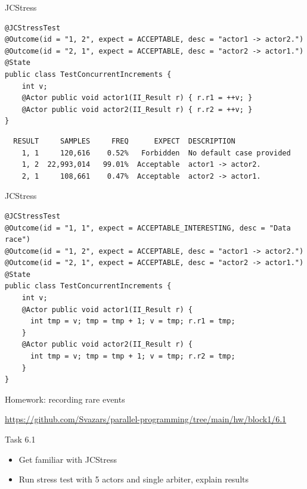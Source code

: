\begin{frame}{JCStress}
\begin{verbatim}
@JCStressTest
@Outcome(id = "1, 2", expect = ACCEPTABLE, desc = "actor1 -> actor2.")
@Outcome(id = "2, 1", expect = ACCEPTABLE, desc = "actor2 -> actor1.")
@State
public class TestConcurrentIncrements {
    int v;
    @Actor public void actor1(II_Result r) { r.r1 = ++v; }
    @Actor public void actor2(II_Result r) { r.r2 = ++v; }
}
\end{verbatim}

\begin{verbatim}
  RESULT     SAMPLES     FREQ      EXPECT  DESCRIPTION
    1, 1     120,616    0.52%   Forbidden  No default case provided
    1, 2  22,993,014   99.01%  Acceptable  actor1 -> actor2.
    2, 1     108,661    0.47%  Acceptable  actor2 -> actor1.
\end{verbatim}
\end{frame}

\begin{frame}{JCStress}

\begin{verbatim}
@JCStressTest
@Outcome(id = "1, 1", expect = ACCEPTABLE_INTERESTING, desc = "Data race")
@Outcome(id = "1, 2", expect = ACCEPTABLE, desc = "actor1 -> actor2.")
@Outcome(id = "2, 1", expect = ACCEPTABLE, desc = "actor2 -> actor1.")
@State
public class TestConcurrentIncrements {
    int v;
    @Actor public void actor1(II_Result r) { 
      int tmp = v; tmp = tmp + 1; v = tmp; r.r1 = tmp;
    }
    @Actor public void actor2(II_Result r) { 
      int tmp = v; tmp = tmp + 1; v = tmp; r.r2 = tmp;
    }
}
\end{verbatim}
\end{frame}

\begin{frame}[t,fragile]{Homework: recording rare events}

{\small\url{https://github.com/Svazars/parallel-programming/tree/main/hw/block1/6.1}}
\begin{homeworkmail}{Task 6.1}
    \begin{itemize}
        \item Get familiar with JCStress
        \item Run stress test with 5 actors and single arbiter, explain results
    \end{itemize}
\end{homeworkmail}
\end{frame}


